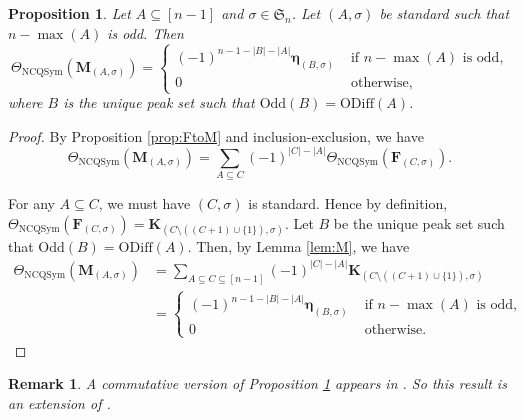 \documentclass[11pt]{amsart}
\newtheorem{Proposition}[Theorem]{Proposition}
\newtheorem{Remark}[Theorem]{Remark}
\numberwithin{equation}{section}
\newcommand{\NCQSym}{\mathrm{NCQSym}}
\newcommand{\odd}{\mathrm{Odd}}
\newcommand{\oddd}{\mathrm{ODiff}}
\newcommand{\boldeta}{{\boldsymbol{\eta}}}
\begin{document}
\begin{Proposition}\label{prop:M} 
Let $A\subseteq [n-1]$ and $\sigma\in \mathfrak{S}_n$.  
	Let $(A,\sigma)$ be standard such that $n-\max(A)$ is odd. Then
	$$\Theta_{\NCQSym}(\mathbf{M}_{(A,\sigma)})=\begin{cases}
			(-1)^{n-1-|B|-|A|}\boldeta_{(B,\sigma)} & \text{ if }n-\max(A)\text{ is odd,}\\
			0 & \text{ otherwise,}
		\end{cases}
		$$
		where $B$ is the unique peak set such that $\odd(B)=\oddd(A)$.
\end{Proposition}

\begin{proof}
	By Proposition \ref{prop:FtoM} and inclusion-exclusion, we have
	$$\Theta_{\NCQSym}(\mathbf{M}_{(A,\sigma)})=\sum_{A\subseteq C}(-1)^{|C|-|A|}\Theta_{\NCQSym}(\mathbf{F}_{(C,\sigma)}).$$
	
	For any $A\subseteq C$, we must have $(C,\sigma)$ is standard. Hence by definition, $\Theta_{\NCQSym}(\mathbf{F}_{(C,\sigma)})=\mathbf{K}_{(C\setminus((C+1)\cup\{1\}),\sigma)}$. Let $B$ be the unique peak set such that $\odd(B)=\oddd(A)$. Then, by Lemma \ref{lem:M}, we have
	\begin{align*}
		\Theta_{\NCQSym}(\mathbf{M}_{(A,\sigma)})&=\sum_{A\subseteq C\subseteq[n-1]}(-1)^{|C|-|A|}\mathbf{K}_{(C\setminus((C+1)\cup\{1\}),\sigma)}\\
		&=\begin{cases}
			(-1)^{n-1-|B|-|A|}\boldeta_{(B,\sigma)} & \text{ if }n-\max(A)\text{ is odd,}\\
			0 & \text{ otherwise.}
		\end{cases}
	\end{align*}
	
\end{proof}

\begin{Remark}\label{rem:comm-m}
	A commutative version of Proposition \ref{prop:M} appears in \cite[Theorem 2.4]{H07}. So this result is an extension of \cite[Theorem 2.4]{H07}.
\end{Remark}
\end{document}
